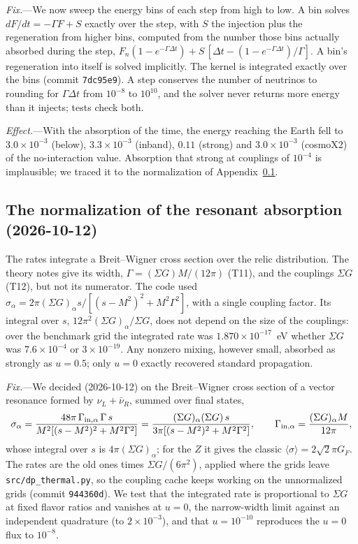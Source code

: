 \documentclass[11pt,a4paper]{article}
\newcommand{\file}[1]{\nolinkurl{#1}}
\begin{document}
\textit{Fix.}---We now sweep the energy bins of each step from high to low. A bin solves
$dF/dt = -\Gamma F + S$ exactly over the step, with $S$ the injection plus the regeneration from
higher bins, computed from the number those bins actually absorbed during the step,
$F_n(1-e^{-\Gamma\Delta t}) + S\,[\Delta t - (1-e^{-\Gamma\Delta t})/\Gamma]$. A bin's
regeneration into itself is solved implicitly. The kernel is integrated exactly over the
bins (commit \texttt{7dc95e9}). A step conserves the number of neutrinos to rounding for
$\Gamma\Delta t$ from $10^{-8}$ to $10^{10}$, and the solver never returns more energy than it
injects; tests check both.

\textit{Effect.}---With the absorption of the time, the energy reaching the Earth fell to
$3.0\times10^{-3}$ (below), $3.3\times10^{-3}$ (inband), $0.11$ (strong) and $3.0\times10^{-3}$
(cosmoX2) of the no-interaction value. Absorption that strong at couplings of $10^{-4}$ is
implausible; we traced it to the normalization of Appendix~\ref{app:bwnorm}.

\subsection{The normalization of the resonant absorption (2026-10-12)}
\label{app:bwnorm}

The rates integrate a Breit--Wigner cross section over the relic distribution. The theory notes
give its width, $\Gamma = (\Sigma G)M/(12\pi)$ (T11), and the couplings $\Sigma G$ (T12), but
not its numerator. The code used $\sigma_\alpha = 2\pi(\Sigma G)_\alpha s/[(s-M^2)^2 + M^2\Gamma^2]$,
with a single coupling factor. Its integral over $s$, $12\pi^2(\Sigma G)_\alpha/\Sigma G$, does not
depend on the size of the couplings: over the benchmark grid the integrated rate was
$1.870\times10^{-17}$~eV whether $\Sigma G$ was $7.6\times10^{-4}$ or $3\times10^{-19}$. Any
nonzero mixing, however small, absorbed as strongly as $u = 0.5$; only $u = 0$ exactly
recovered standard propagation.

\textit{Fix.}---We decided (2026-10-12) on the Breit--Wigner cross section of a vector resonance
formed by $\nu_L + \bar\nu_R$, summed over final states,
\begin{equation}
\sigma_\alpha = \frac{48\pi\,\Gamma_{{\rm in},\alpha}\,\Gamma\,s}{M^2[(s-M^2)^2+M^2\Gamma^2]}
= \frac{(\Sigma G)_\alpha(\Sigma G)\,s}{3\pi[(s-M^2)^2+M^2\Gamma^2]} ,
\qquad \Gamma_{{\rm in},\alpha} = \frac{(\Sigma G)_\alpha M}{12\pi} ,
\end{equation}
whose integral over $s$ is $4\pi(\Sigma G)_\alpha$; for the $Z$ it gives the classic
$\langle\sigma\rangle = 2\sqrt2\pi G_F$. The rates are the old ones times $\Sigma G/(6\pi^2)$,
applied where the grids leave \file{src/dp\_thermal.py}, so the coupling cache keeps working on
the unnormalized grids (commit \texttt{944360d}). We test that the integrated rate is
proportional to $\Sigma G$ at fixed flavor ratios and vanishes at $u = 0$, the narrow-width limit
against an independent quadrature (to $2\times10^{-3}$), and that $u = 10^{-10}$ reproduces the
$u = 0$ flux to $10^{-8}$.
\end{document}
